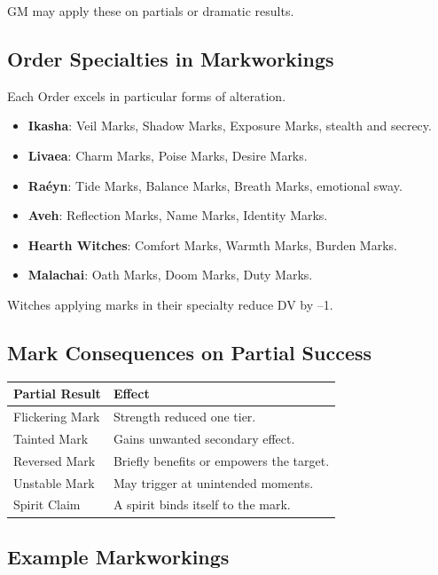 \documentclass[11pt]{book}
\begin{document}
GM may apply these on partials or dramatic results.

\subsection*{Order Specialties in Markworkings}

Each Order excels in particular forms of alteration.

\begin{itemize}
    \item \textbf{Ikasha}: Veil Marks, Shadow Marks, Exposure Marks, stealth and secrecy.
    \item \textbf{Livaea}: Charm Marks, Poise Marks, Desire Marks.
    \item \textbf{Raéyn}: Tide Marks, Balance Marks, Breath Marks, emotional sway.
    \item \textbf{Aveh}: Reflection Marks, Name Marks, Identity Marks.
    \item \textbf{Hearth Witches}: Comfort Marks, Warmth Marks, Burden Marks.
    \item \textbf{Malachai}: Oath Marks, Doom Marks, Duty Marks.
\end{itemize}

Witches applying marks in their specialty reduce DV by --1.

\subsection*{Mark Consequences on Partial Success}

\begin{center}
\begin{longtable}{p{} p{}}
\toprule
\textbf{Partial Result} & \textbf{Effect} \\
\midrule
Flickering Mark & Strength reduced one tier. \\
Tainted Mark & Gains unwanted secondary effect. \\
Reversed Mark & Briefly benefits or empowers the target. \\
Unstable Mark & May trigger at unintended moments. \\
Spirit Claim & A spirit binds itself to the mark. \\
\bottomrule
\end{longtable}
\end{center}

\subsection*{Example Markworkings}
\end{document}
